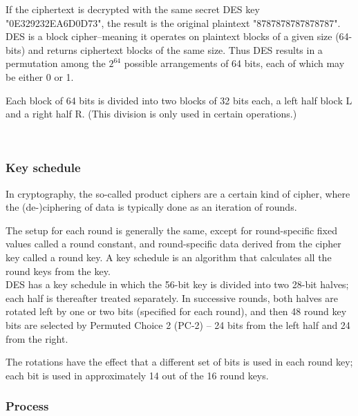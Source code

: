 \documentclass[fleqn, journal, onecolumn]{IEEEtran}             %
\theoremstyle{break}                                            %
\begin{document}
    
    If the ciphertext is decrypted 
    with the same secret DES key "0E329232EA6D0D73", the result is the original plaintext "8787878787878787".  \\[0.2cm]

    DES is a block cipher--meaning it operates on plaintext blocks of a given size (64-bits) and returns ciphertext 
    blocks of the same size. Thus DES results in a permutation among the $2^{64}$
    possible arrangements of 64 bits, each of which may be either 0 or 1. 
    
    Each block of 64 bits is divided into two blocks of 32 bits each, a left half block L and a right half R. 
    (This division is only used in certain operations.)

    \cite{page} \\[0.4cm]

      \subsubsection{Key schedule}

        In cryptography, the so-called product ciphers are a certain kind of cipher, 
        where the (de-)ciphering of data is typically done as an iteration of rounds. 
        
        The setup for each round is generally the same, except for round-specific fixed values called a 
        round constant, and round-specific data derived from the cipher key called a round key. 
        A key schedule is an algorithm that calculates all the round keys from the key. \\[0.2cm]

        DES has a key schedule in which the 56-bit key is divided into two 28-bit halves; each half 
        is thereafter treated separately. In successive rounds, both halves are rotated left by one 
        or two bits (specified for each round), and then 48 round key bits are selected by Permuted
        Choice 2 (PC-2) – 24 bits from the left half and 24 from the right. 
        
        The rotations have the effect that a different set of bits is used in each round key; each bit
        is used in approximately 14 out of the 16 round keys.


      \subsubsection{Process}
\end{document}

